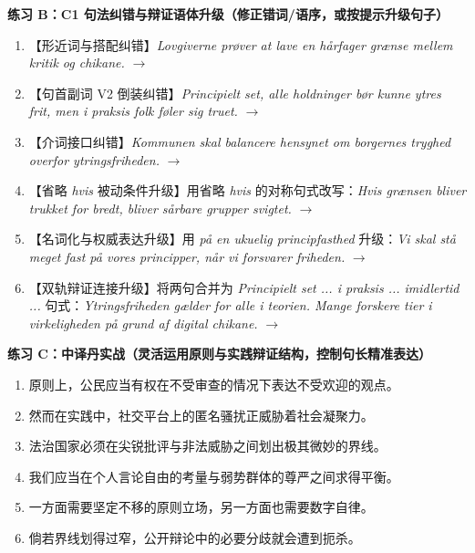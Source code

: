\textbf{练习 B：C1 句法纠错与辩证语体升级（修正错词/语序，或按提示升级句子）}
\begin{enumerate}
  \item 【形近词与搭配纠错】\textit{Lovgiverne prøver at lave en hårfager grænse mellem kritik og chikane.} $\rightarrow$
  \item 【句首副词 V2 倒装纠错】\textit{Principielt set, alle holdninger bør kunne ytres frit, men i praksis folk føler sig truet.} $\rightarrow$
  \item 【介词接口纠错】\textit{Kommunen skal balancere hensynet om borgernes tryghed overfor ytringsfriheden.} $\rightarrow$
  \item 【省略 \textit{hvis} 被动条件升级】用省略 \textit{hvis} 的对称句式改写：\textit{Hvis grænsen bliver trukket for bredt, bliver sårbare grupper svigtet.} $\rightarrow$
  \item 【名词化与权威表达升级】用 \textit{på en ukuelig principfasthed} 升级：\textit{Vi skal stå meget fast på vores principper, når vi forsvarer friheden.} $\rightarrow$
  \item 【双轨辩证连接升级】将两句合并为 \textit{Principielt set ... i praksis ... imidlertid ...} 句式：\textit{Ytringsfriheden gælder for alle i teorien. Mange forskere tier i virkeligheden på grund af digital chikane.} $\rightarrow$
\end{enumerate}

\textbf{练习 C：中译丹实战（灵活运用原则与实践辩证结构，控制句长精准表达）}
\begin{enumerate}
  \item 原则上，公民应当有权在不受审查的情况下表达不受欢迎的观点。
  \item 然而在实践中，社交平台上的匿名骚扰正威胁着社会凝聚力。
  \item 法治国家必须在尖锐批评与非法威胁之间划出极其微妙的界线。
  \item 我们应当在个人言论自由的考量与弱势群体的尊严之间求得平衡。
  \item 一方面需要坚定不移的原则立场，另一方面也需要数字自律。
  \item 倘若界线划得过窄，公开辩论中的必要分歧就会遭到扼杀。
\end{enumerate}


